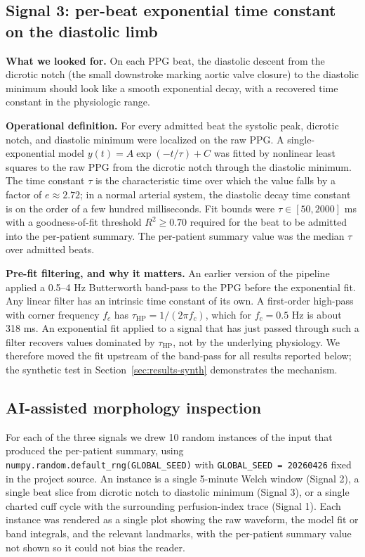 \documentclass[twocolumn,letterpaper,10pt]{article}
\begin{document}
\subsection{Signal 3: per-beat exponential time constant on the diastolic limb}

\textbf{What we looked for.} On each PPG beat, the diastolic descent from the dicrotic notch (the small downstroke marking aortic valve closure) to the diastolic minimum should look like a smooth exponential decay, with a recovered time constant in the physiologic range.

\textbf{Operational definition.} For every admitted beat the systolic peak, dicrotic notch, and diastolic minimum were localized on the raw PPG. A single-exponential model $y(t) = A\exp(-t/\tau) + C$ was fitted by nonlinear least squares to the raw PPG from the dicrotic notch through the diastolic minimum. The time constant $\tau$ is the characteristic time over which the value falls by a factor of $e \approx 2.72$; in a normal arterial system, the diastolic decay time constant is on the order of a few hundred milliseconds. Fit bounds were $\tau \in [50, 2000]$ ms with a goodness-of-fit threshold $R^2 \geq 0.70$ required for the beat to be admitted into the per-patient summary. The per-patient summary value was the median $\tau$ over admitted beats.

\textbf{Pre-fit filtering, and why it matters.} An earlier version of the pipeline applied a 0.5--4 Hz Butterworth band-pass to the PPG before the exponential fit. Any linear filter has an intrinsic time constant of its own. A first-order high-pass with corner frequency $f_c$ has $\tau_{\mathrm{HP}} = 1/(2\pi f_c)$, which for $f_c = 0.5$ Hz is about 318 ms. An exponential fit applied to a signal that has just passed through such a filter recovers values dominated by $\tau_{\mathrm{HP}}$, not by the underlying physiology. We therefore moved the fit upstream of the band-pass for all results reported below; the synthetic test in Section~\ref{sec:results-synth} demonstrates the mechanism.

\subsection{AI-assisted morphology inspection}

For each of the three signals we drew 10 random instances of the input that produced the per-patient summary, using \texttt{numpy.random.default\_rng(GLOBAL\_SEED)} with \texttt{GLOBAL\_SEED = 20260426} fixed in the project source. An instance is a single 5-minute Welch window (Signal 2), a single beat slice from dicrotic notch to diastolic minimum (Signal 3), or a single charted cuff cycle with the surrounding perfusion-index trace (Signal 1). Each instance was rendered as a single plot showing the raw waveform, the model fit or band integrals, and the relevant landmarks, with the per-patient summary value not shown so it could not bias the reader.
\end{document}
